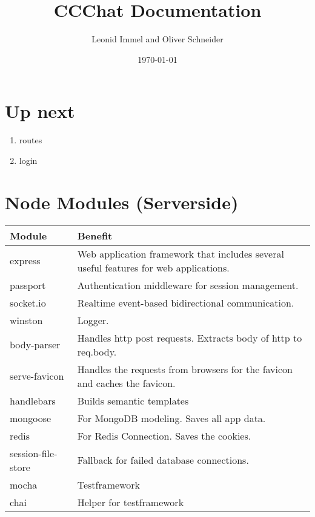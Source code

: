 \documentclass[10pt,a4paper,landscape]{article}
\title{CCChat Documentation}
\date{\today}
\author{Leonid Immel and Oliver Schneider}
\begin{document}
\maketitle
\tableofcontents

\section{Up next}
\begin{enumerate}
        \item
                routes
        \item
                login
\end{enumerate}

\section{Node Modules (Serverside)}
\begin{tabularx}{\textwidth}{ll}
    \textbf{Module} & \textbf{Benefit}               \\
    \toprule
    express         & Web application framework that includes several useful features for web applications. \\ 
    \midrule
    passport        & Authentication middleware for session management. \\
    \midrule
    socket.io       & Realtime event-based bidirectional communication. \\
    \midrule
    winston         & Logger. \\
    \midrule
    body-parser     & Handles http post requests. Extracts body of http to req.body. \\
    \midrule
    serve-favicon   & Handles the requests from browsers for the favicon and caches the favicon. \\
    \midrule
    handlebars      & Builds semantic templates \\
    \midrule
    mongoose        & For MongoDB modeling. Saves all app data. \\
    \midrule
    redis           & For Redis Connection. Saves the cookies. \\
    \midrule
    session-file-store & Fallback for failed database connections.\\
    \midrule
    mocha           & Testframework \\
    \midrule
    chai            & Helper for testframework \\
    \bottomrule
\end{tabularx}
\end{document}
